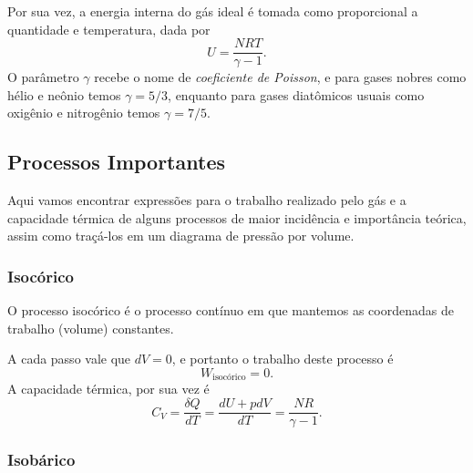 Por sua vez, a energia interna do gás ideal é tomada como proporcional a
quantidade e temperatura, dada por
$$U=\frac{NRT}{\gamma-1}.$$
O parâmetro $\gamma$ recebe o nome de \emph{coeficiente de Poisson}, e para
gases nobres como hélio e neônio temos $\gamma=5/3$, enquanto para gases
diatômicos usuais como oxigênio e nitrogênio temos $\gamma=7/5$. 

\subsection{Processos Importantes}

Aqui vamos encontrar expressões para o trabalho realizado pelo gás e a
capacidade térmica de alguns processos de maior incidência e importância
teórica, assim como traçá-los em um diagrama de pressão por volume.

\subsubsection{Isocórico}

O processo isocórico é o processo contínuo em que mantemos as coordenadas de
trabalho (volume) constantes.
\begin{figure}[H]
    \centering
\end{figure}
A cada passo vale que $dV=0$, e portanto o trabalho deste processo é $$W_\text{
isocórico}=0.$$ A capacidade térmica, por sua vez é
$$C_V=\frac{\delta Q}{dT}=\frac{dU+pdV}{dT}=\frac{NR}{\gamma-1}.$$

\subsubsection{Isobárico}


